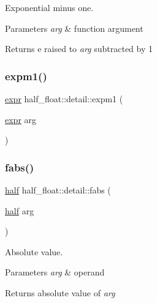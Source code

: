 Exponential minus one. 
\begin{DoxyParams}{Parameters}
{\em arg} & function argument \\
\hline
\end{DoxyParams}
\begin{DoxyReturn}{Returns}
e raised to {\itshape arg} subtracted by 1 
\end{DoxyReturn}
\mbox{\label{namespacehalf__float_1_1detail_afdac01457ab03f14285ce6b358221bda}} 
\subsubsection{\texorpdfstring{expm1()}{expm1()}\hspace{0.1cm}{\footnotesize\ttfamily [2/2]}}
{\footnotesize\ttfamily \hyperlink{structhalf__float_1_1detail_1_1expr}{expr} half\+\_\+float\+::detail\+::expm1 (\begin{DoxyParamCaption}\item[{\hyperlink{structhalf__float_1_1detail_1_1expr}{expr}}]{arg }\end{DoxyParamCaption})\hspace{0.3cm}{\ttfamily [inline]}}

\mbox{\label{namespacehalf__float_1_1detail_a70f276b86204e71756d873694cf1e2ca}} 
\subsubsection{\texorpdfstring{fabs()}{fabs()}\hspace{0.1cm}{\footnotesize\ttfamily [1/2]}}
{\footnotesize\ttfamily \hyperlink{classhalf__float_1_1half}{half} half\+\_\+float\+::detail\+::fabs (\begin{DoxyParamCaption}\item[{\hyperlink{classhalf__float_1_1half}{half}}]{arg }\end{DoxyParamCaption})\hspace{0.3cm}{\ttfamily [inline]}}

Absolute value. 
\begin{DoxyParams}{Parameters}
{\em arg} & operand \\
\hline
\end{DoxyParams}
\begin{DoxyReturn}{Returns}
absolute value of {\itshape arg} 
\end{DoxyReturn}
\mbox{\label{namespacehalf__float_1_1detail_af04ac1aefbabcf120d3cdf3ec75555ac}} 
